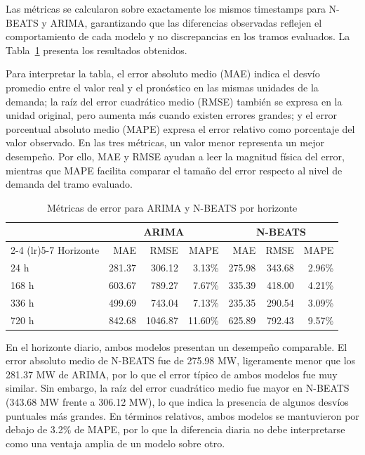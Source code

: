 Las métricas se calcularon sobre exactamente los mismos timestamps para N-BEATS y ARIMA, garantizando que las diferencias observadas reflejen el comportamiento de cada modelo y no discrepancias en los tramos evaluados. La Tabla~\ref{tab:metricas-modelos} presenta los resultados obtenidos.

Para interpretar la tabla, el error absoluto medio (MAE) indica el desvío promedio entre el valor real y el pronóstico en las mismas unidades de la demanda; la raíz del error cuadrático medio (RMSE) también se expresa en la unidad original, pero aumenta más cuando existen errores grandes; y el error porcentual absoluto medio (MAPE) expresa el error relativo como porcentaje del valor observado. En las tres métricas, un valor menor representa un mejor desempeño. Por ello, MAE y RMSE ayudan a leer la magnitud física del error, mientras que MAPE facilita comparar el tamaño del error respecto al nivel de demanda del tramo evaluado.

\begin{table}[htbp]
    \centering
    \caption{Métricas de error para ARIMA y N-BEATS por horizonte}
    \label{tab:metricas-modelos}
    \begin{tabular}{lrrrrrr}
        \toprule
        & \multicolumn{3}{c}{ARIMA} & \multicolumn{3}{c}{N-BEATS} \\
        \cmidrule(lr){2-4} \cmidrule(lr){5-7}
        Horizonte & MAE & RMSE & MAPE & MAE & RMSE & MAPE \\
        \midrule
        24 h & 281.37 & 306.12 & 3.13\% & 275.98 & 343.68 & 2.96\% \\
        168 h & 603.67 & 789.27 & 7.67\% & 335.39 & 418.00 & 4.21\% \\
        336 h & 499.69 & 743.04 & 7.13\% & 235.35 & 290.54 & 3.09\% \\
        720 h & 842.68 & 1046.87 & 11.60\% & 625.89 & 792.43 & 9.57\% \\
        \bottomrule
    \end{tabular}
\end{table}

En el horizonte diario, ambos modelos presentan un desempeño comparable. El error absoluto medio de N-BEATS fue de 275.98 MW, ligeramente menor que los 281.37 MW de ARIMA, por lo que el error típico de ambos modelos fue muy similar. Sin embargo, la raíz del error cuadrático medio fue mayor en N-BEATS (343.68 MW frente a 306.12 MW), lo que indica la presencia de algunos desvíos puntuales más grandes. En términos relativos, ambos modelos se mantuvieron por debajo de 3.2\% de MAPE, por lo que la diferencia diaria no debe interpretarse como una ventaja amplia de un modelo sobre otro.

